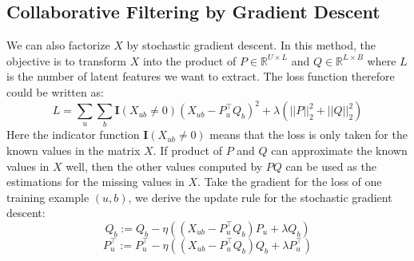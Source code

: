 \documentclass[conference]{IEEEtran}
\begin{document}
\subsection{Collaborative Filtering by Gradient Descent}
We can also factorize $X$ by stochastic gradient descent. In this method, 
the objective is to transform $X$ into the product of 
$P \in \mathbb R^{U \times L}$ and 
$Q \in \mathbb R^{L \times B}$ where $L$ is the number of latent features
we want to extract. The loss function therefore could be written as:
\[
L = \sum_u \sum_b \mathbf{I}(X_{ub} \ne 0)(X_{ub} - P^{\top}_u Q_b)^2 
+ \lambda (||P||_2^2  + ||Q||_2^2)
\]
Here the indicator function $\mathbf{I}(X_{ub} \ne 0)$ means that the 
loss is only taken for the known values in the matrix $X$. 
If product of $P$ and $Q$ can approximate the known values in $X$ well,
then the other values computed by $PQ$ can be used as the estimations 
for the missing values in $X$. Take the gradient for the loss
of one training example $(u, b)$, 
we derive the update rule for the stochastic gradient descent:
\[
Q_b := Q_b - \eta \left(
(X_{ub} - P^{\top}_u Q_b) P_u + \lambda Q_b
\right)
\]
\[
P^{\top}_u := P^{\top}_u - \eta \left(
(X_{ub} - P^{\top}_u Q_b) Q_b + \lambda P^{\top}_u
\right)
\]
\end{document}
